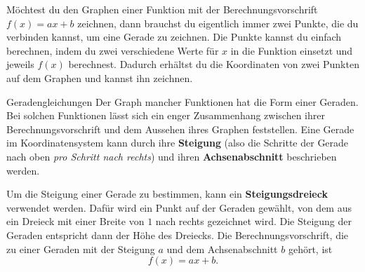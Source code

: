 \documentclass[../../main.tex]{subfiles}
\begin{document}
Möchtest du den Graphen einer Funktion mit der Berechnungsvorschrift $f(x)=ax+b$ zeichnen, dann brauchst du eigentlich immer zwei Punkte, die du verbinden kannst, um eine Gerade zu zeichnen. Die Punkte kannst du einfach berechnen, indem du zwei verschiedene Werte für $x$ in die Funktion einsetzt und jeweils $f(x)$ berechnest. Dadurch erhältst du die Koordinaten von zwei Punkten auf dem Graphen und kannst ihn zeichnen.

\begin{nutshell}{Geradengleichungen}
    Der Graph mancher Funktionen hat die Form einer Geraden. Bei solchen Funktionen lässt sich ein enger Zusammenhang zwischen ihrer Berechnungsvorschrift und dem Aussehen ihres Graphen feststellen. Eine Gerade im Koordinatensystem kann durch ihre \textbf{Steigung} (also die Schritte der Gerade nach oben \emph{pro Schritt nach rechts}) und ihren \textbf{Achsenabschnitt} beschrieben werden.
    
    Um die Steigung einer Gerade zu bestimmen, kann ein \textbf{Steigungsdreieck} verwendet werden. Dafür wird ein Punkt auf der Geraden gewählt, von dem aus ein Dreieck mit einer Breite von $1$ nach rechts gezeichnet wird. Die Steigung der Geraden entspricht dann der Höhe des Dreiecks. Die Berechnungsvorschrift, die zu einer Geraden mit der Steigung $a$ und dem Achsenabschnitt $b$ gehört, ist
    \[f(x)=ax+b.\]
\end{nutshell}
\end{document}
